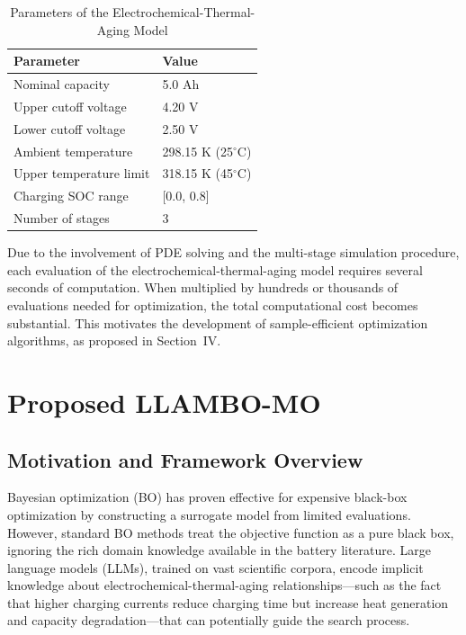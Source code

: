 \documentclass[lettersize,journal]{IEEEtran}
\begin{document}
\begin{table}[!t]
\caption{Parameters of the Electrochemical-Thermal-Aging Model}
\label{tab:sim_params}
\centering
\begin{tabular}{ll}
\toprule
Parameter & Value \\
\midrule
Nominal capacity & 5.0 Ah \\
Upper cutoff voltage & 4.20 V \\
Lower cutoff voltage & 2.50 V \\
Ambient temperature & 298.15 K (25$^\circ$C) \\
Upper temperature limit & 318.15 K (45$^\circ$C) \\
Charging SOC range & [0.0, 0.8] \\
Number of stages & 3 \\
\bottomrule
\end{tabular}
\end{table}

Due to the involvement of PDE solving and the multi-stage simulation procedure, each evaluation of the electrochemical-thermal-aging model requires several seconds of computation. When multiplied by hundreds or thousands of evaluations needed for optimization, the total computational cost becomes substantial. This motivates the development of sample-efficient optimization algorithms, as proposed in Section~IV.

\section{Proposed LLAMBO-MO}

\subsection{Motivation and Framework Overview}

Bayesian optimization (BO) has proven effective for expensive black-box optimization by constructing a surrogate model from limited evaluations. However, standard BO methods treat the objective function as a pure black box, ignoring the rich domain knowledge available in the battery literature. Large language models (LLMs), trained on vast scientific corpora, encode implicit knowledge about electrochemical-thermal-aging relationships---such as the fact that higher charging currents reduce charging time but increase heat generation and capacity degradation---that can potentially guide the search process.
\end{document}
